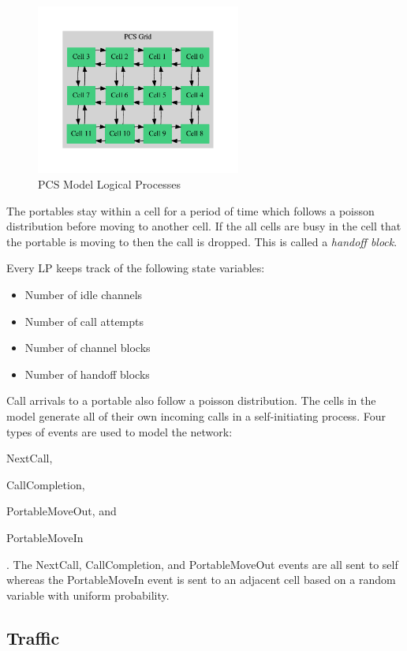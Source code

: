 \documentclass[11pt]{book}
\begin{document}
\begin{figure}
    \centering
    \includegraphics[width=0.6\textwidth,quiet]{figs/graphviz/pcs_model.pdf}
    \caption{PCS Model Logical Processes}\label{pcs_model_lps}
\end{figure}

The portables stay within a cell for a period of time which follows a poisson distribution
before moving to another cell.  If the all cells are busy in the cell that the portable
is moving to then the call is dropped.  This is called a \emph{handoff block}.

Every LP keeps track of the following state variables:
\begin{itemize}
    \item Number of idle channels
    \item Number of call attempts
    \item Number of channel blocks
    \item Number of handoff blocks
\end{itemize}

\noindent
Call arrivals to a portable also follow a poisson distribution.  The cells in the model
generate all of their own incoming calls in a self-initiating process.
Four types of events are used to model the network: \begin{inparaenum}[(1)] \item NextCall,
\item CallCompletion, \item PortableMoveOut, and \item PortableMoveIn \end{inparaenum}.
The NextCall, CallCompletion, and PortableMoveOut events are all sent to self whereas
the PortableMoveIn event is sent to an adjacent cell based on a random variable with
uniform probability.

\subsection{Traffic}
\end{document}
